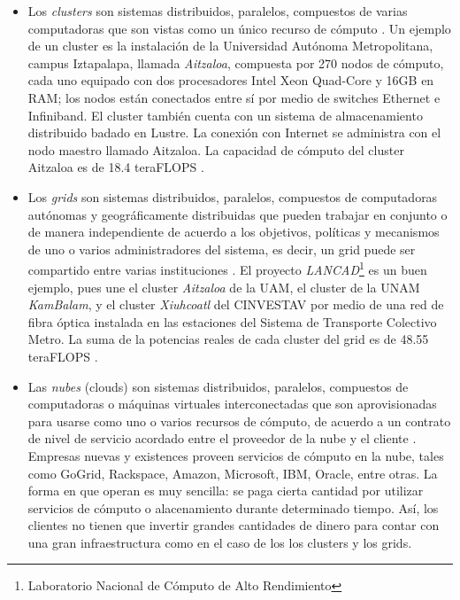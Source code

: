 \documentclass{article}
\begin{document}
\begin{itemize}
\item Los \emph{clusters} son sistemas distribuidos, paralelos, compuestos de varias computadoras que son vistas como un único recurso de cómputo \cite{buyya2009cloud}. Un ejemplo de un cluster es la instalación de la Universidad Autónoma Metropolitana, campus Iztapalapa, llamada \emph{Aitzaloa}, compuesta por 270 nodos de cómputo, cada uno equipado con dos procesadores Intel Xeon Quad-Core y 16GB en RAM; los nodos están conectados entre sí por medio de switches Ethernet e Infiniband. El cluster también cuenta con un sistema de almacenamiento distribuido badado en Lustre. La conexión con Internet se administra con el nodo maestro llamado Aitzaloa. La capacidad de cómputo del cluster Aitzaloa es de 18.4 teraFLOPS \cite{uamz2013tizaloa}.

\item Los \emph{grids} son sistemas distribuidos, paralelos, compuestos de computadoras autónomas y geográficamente distribuidas que pueden trabajar en conjunto o de manera independiente de acuerdo a los objetivos, políticas y mecanismos de uno o varios administradores del sistema, es decir, un grid puede ser compartido entre varias instituciones \cite{buyya2009cloud}. El proyecto \emph{LANCAD}\footnote{Laboratorio Nacional de Cómputo de Alto Rendimiento} es un buen ejemplo, pues une el cluster \emph{Aitzaloa} de la UAM, el cluster de la UNAM \emph{KamBalam}, y el cluster \emph{Xiuhcoatl} del CINVESTAV por medio de una red de fibra óptica instalada en las estaciones del Sistema de Transporte Colectivo Metro. La suma de la potencias reales de cada cluster  del grid es de 48.55 teraFLOPS \cite{lancad2013xiuhcoatl}.

\item Las \emph{nubes} (clouds) son sistemas distribuidos, paralelos, compuestos de computadoras o máquinas virtuales interconectadas que son aprovisionadas para usarse como uno o varios recursos de cómputo, de acuerdo a un contrato de nivel de servicio acordado entre el proveedor de la nube y el cliente \cite{buyya2009cloud}. Empresas nuevas y existences proveen servicios de cómputo en la nube, tales como GoGrid, Rackspace, Amazon, Microsoft, IBM, Oracle, entre otras. La forma en que operan es muy sencilla: se paga cierta cantidad por utilizar servicios de cómputo o alacenamiento durante determinado tiempo. Así, los clientes no tienen que invertir grandes cantidades de dinero para contar con una gran infraestructura como en el caso de los los clusters y los grids.
\end{itemize}
\end{document}
